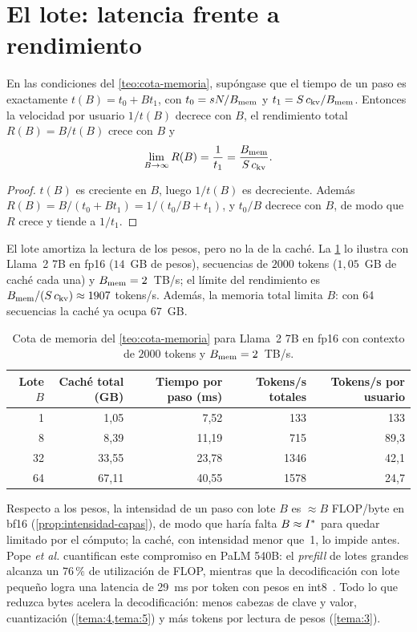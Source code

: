 \section{El lote: latencia frente a rendimiento}

\begin{proposicion}\label{prop:lote}
En las condiciones del \cref{teo:cota-memoria}, supóngase que el tiempo de un paso es exactamente $t(B)=t_0+Bt_1$, con $t_0=sN/B_{\mathrm{mem}}$ y $t_1=S\,c_{\mathrm{kv}}/B_{\mathrm{mem}}$. Entonces la velocidad por usuario $1/t(B)$ decrece con $B$, el rendimiento total $R(B)=B/t(B)$ crece con $B$ y
\[
\lim_{B\to\infty}R(B)=\frac{1}{t_1}=\frac{B_{\mathrm{mem}}}{S\,c_{\mathrm{kv}}}.
\]
\end{proposicion}

\begin{proof}
$t(B)$ es creciente en $B$, luego $1/t(B)$ es decreciente. Además $R(B)=B/(t_0+Bt_1)=1/(t_0/B+t_1)$, y $t_0/B$ decrece con $B$, de modo que $R$ crece y tiende a $1/t_1$.
\end{proof}

El lote amortiza la lectura de los pesos, pero no la de la caché. La \cref{tab:lote} lo ilustra con Llama~2 7B en fp16 ($14$~GB de pesos), secuencias de $2000$ tokens ($1{,}05$~GB de caché cada una) y $B_{\mathrm{mem}}=2$~TB/s; el límite del rendimiento es $B_{\mathrm{mem}}/(S\,c_{\mathrm{kv}})\approx 1907$ tokens/s. Además, la memoria total limita $B$: con 64 secuencias la caché ya ocupa $67$~GB.

\begin{table}[h]
\centering\small
\begin{tabular}{@{}rrrrr@{}}
\toprule
Lote $B$ & Caché total (GB) & Tiempo por paso (ms) & Tokens/s totales & Tokens/s por usuario \\
\midrule
1 & 1{,}05 & 7{,}52 & 133 & 133 \\
8 & 8{,}39 & 11{,}19 & 715 & 89{,}3 \\
32 & 33{,}55 & 23{,}78 & 1346 & 42{,}1 \\
64 & 67{,}11 & 40{,}55 & 1578 & 24{,}7 \\
\bottomrule
\end{tabular}
\caption{Cota de memoria del \cref{teo:cota-memoria} para Llama~2 7B en fp16 con contexto de $2000$ tokens y $B_{\mathrm{mem}}=2$~TB/s.}
\label{tab:lote}
\end{table}

\begin{observacion}
Respecto a los pesos, la intensidad de un paso con lote $B$ es $\approx B$ FLOP/byte en bf16 (\cref{prop:intensidad-capas}), de modo que haría falta $B\approx I^{\ast}$ para quedar limitado por el cómputo; la caché, con intensidad menor que~1, lo impide antes. Pope \emph{et al.} cuantifican este compromiso en PaLM 540B: el \emph{prefill} de lotes grandes alcanza un $76\,\%$ de utilización de FLOP, mientras que la decodificación con lote pequeño logra una latencia de 29~ms por token con pesos en int8~\cite{pope}. Todo lo que reduzca bytes acelera la decodificación: menos cabezas de clave y valor, cuantización (\cref{tema:4,tema:5}) y más tokens por lectura de pesos (\cref{tema:3}).
\end{observacion}

